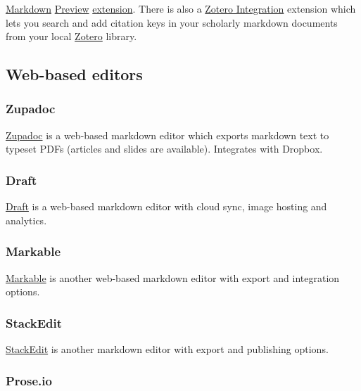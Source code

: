 \documentclass[	DIV=calc,%
							paper=a4,%
							fontsize=10pt]{scrartcl}	 					%
\begin{document}
\href{http://blog.brackets.io/2013/04/23/markdown-extension-for-brackets/?lang=en}{Markdown}
\href{https://github.com/gruehle/MarkdownPreview}{Preview}
\href{https://brackets-registry.aboutweb.com/}{extension}. There is also
a \href{http://baig.github.io/brackets-zotero/}{Zotero Integration}
extension which lets you search and add citation keys in your scholarly
markdown documents from your local
\href{https://www.zotero.org/}{Zotero} library.

\subsection{Web-based editors}\label{web-based-editors}

\subsubsection{Zupadoc}\label{zupadoc}

\href{http://zupadoc.com}{Zupadoc} is a web-based markdown editor which
exports markdown text to typeset PDFs (articles and slides are
available). Integrates with Dropbox.

\subsubsection{Draft}\label{draft}

\href{https://draftin.com}{Draft} is a web-based markdown editor with
cloud sync, image hosting and analytics.

\subsubsection{Markable}\label{markable}

\href{http://markable.in/}{Markable} is another web-based markdown
editor with export and integration options.

\subsubsection{StackEdit}\label{stackedit}

\href{https://stackedit.io/editor}{StackEdit} is another markdown editor
with export and publishing options.

\subsubsection{Prose.io}\label{prose.io}
\end{document}
